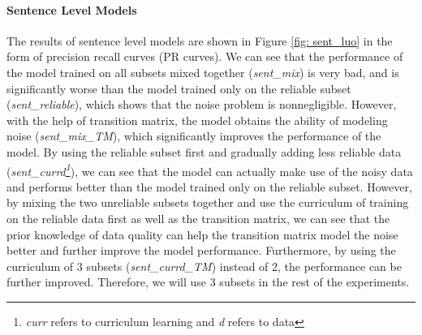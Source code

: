 \paragraph{Sentence Level Models}
The results of sentence level models are shown in Figure \ref{fig: sent_luo} in the form of precision recall curves (PR curves). We can see that the performance of the model trained on all subsets mixed together (\emph{sent\_mix}) is very bad, and is significantly worse than the model trained only on the reliable subset (\emph{sent\_reliable}), which shows that the noise problem is nonnegligible. However, with the help of transition matrix, the model obtains the ability of modeling noise (\emph{sent\_mix\_TM}), which significantly improves the performance of the model. By using the reliable subset first and gradually adding less reliable data (\emph{sent\_currd\footnote{\emph{curr} refers to curriculum learning and \emph{d} refers to data}}), we can see that the model can actually make use of the noisy data and performs better than the model trained only on the reliable subset. However, by mixing the two unreliable subsets together and use the curriculum of training on the reliable data first as well as the transition matrix, we can see that the prior knowledge of data quality can help the transition matrix model the noise better and further improve the model performance. Furthermore, by using the curriculum of 3 subsets (\emph{sent\_currd\_TM}) instead of 2, the performance can be further improved. Therefore, we will use 3 subsets in the rest of the experiments.

